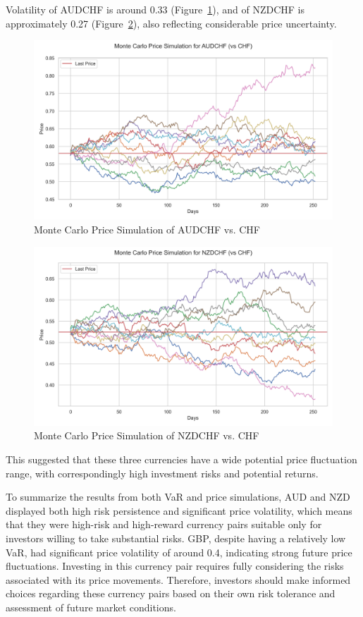 \documentclass{article}
\begin{document}
Volatility of AUDCHF is around 0.33 (Figure~\ref{fig:monte_carlo_price_simulation_AUDCHF_vs_CHF}), and of NZDCHF is approximately 0.27 (Figure~\ref{fig:monte_carlo_price_simulation_NZDCHF_vs_CHF}), also reflecting considerable price uncertainty. 

\begin{figure}[H]
    \centering \includegraphics[width=0.75\linewidth]{reports/figures/monte_carlo_price_simulation_AUDCHF_vs_CHF.png}
    \caption{Monte Carlo Price Simulation of AUDCHF vs. CHF} \label{fig:monte_carlo_price_simulation_AUDCHF_vs_CHF}
\end{figure}

\begin{figure}[H]
    \centering  \includegraphics[width=0.75\linewidth]{reports/figures/monte_carlo_price_simulation_NZDCHF_vs_CHF.png}
    \caption{Monte Carlo Price Simulation of NZDCHF vs. CHF} \label{fig:monte_carlo_price_simulation_NZDCHF_vs_CHF}
\end{figure}
This suggested that these three currencies have a wide potential price fluctuation range, with correspondingly high investment risks and potential returns.

To summarize the results from both VaR and price simulations, AUD and NZD displayed both high risk persistence and significant price volatility, which means that they were high-risk and high-reward currency pairs suitable only for investors willing to take substantial risks. GBP, despite having a relatively low VaR, had significant price volatility of around 0.4, indicating strong future price fluctuations. Investing in this currency pair requires fully considering the risks associated with its price movements. Therefore, investors should make informed choices regarding these currency pairs based on their own risk tolerance and assessment of future market conditions.
\end{document}
